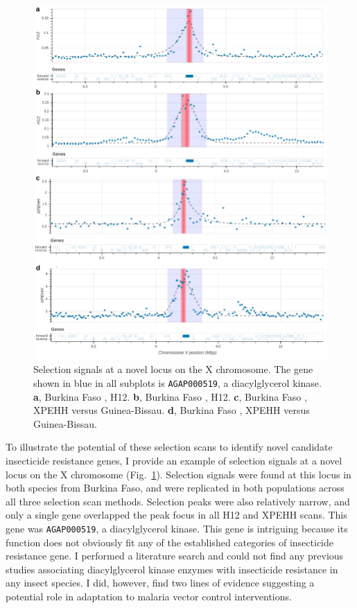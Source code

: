 \begin{refsection}
\begin{figure}[t!]
\centering
\includegraphics[width=1\textwidth,center]{artwork/chapter5/dgk.pdf}
\caption{Selection signals at a novel locus on the X chromosome.
%
The gene shown in blue in all subplots is \texttt{AGAP000519}, a diacylglycerol kinase.
%
\textbf{a}, Burkina Faso \acol, H12.
%
\textbf{b}, Burkina Faso \agam, H12.
%
\textbf{c}, Burkina Faso \acol, XPEHH versus Guinea-Bissau.
%
\textbf{d}, Burkina Faso \agam, XPEHH versus Guinea-Bissau.
}
\label{fig:dgk}
\end{figure}


To illustrate the potential of these selection scans to identify novel candidate insecticide resistance genes, I provide an example of selection signals at a novel locus on the X chromosome (Fig.~\ref{fig:dgk}).
%
Selection signals were found at this locus in both species from Burkina Faso, and were replicated in both populations across all three selection scan methods.
%
Selection peaks were also relatively narrow, and only a single gene overlapped the peak focus in all H12 and XPEHH scans.
%
This gene was \texttt{AGAP000519}, a diacylglycerol kinase.
%
This gene is intriguing because its function does not obviously fit any of the established categories of insecticide resistance gene.
%
I performed a literature search and could not find any previous studies associating diacylglycerol kinase enzymes with insecticide resistance in any insect species.
%
I did, however, find two lines of evidence suggesting a potential role in adaptation to malaria vector control interventions.



\end{refsection}
